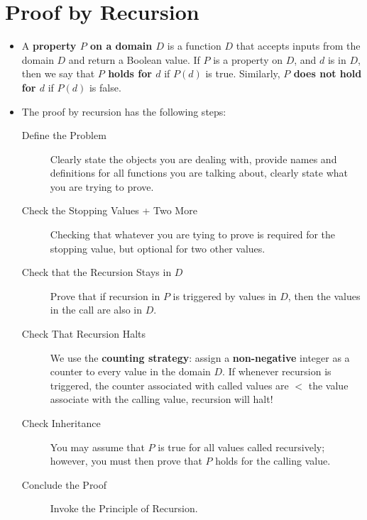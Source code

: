 \documentclass[12pt]{scrartcl}
\begin{document}
\section{Proof by Recursion}
\begin{itemize}
    \item A \textbf{property $P$ on a domain $D$} is a function $D$ that accepts inputs from the domain $D$ and return a Boolean value. If $P$ is a property on $D$, and $d$ is in $D$, then we say that \textbf{$P$ holds for $d$} if $P(d)$ is true. Similarly, \textbf{$P$ does not hold for $d$} if $P(d)$ is false.

    \item The proof by recursion has the following steps:

        \begin{description}
            \item[Define the Problem] Clearly state the objects you are dealing with, provide names and definitions for all functions you are talking about, clearly state what you are trying to prove.
            \item[Check the Stopping Values + Two More] Checking that whatever you are tying to prove is required for the stopping value, but optional for two other values.
            \item[Check that the Recursion Stays in $D$] Prove that if recursion in $P$ is triggered by values in $D$, then the values in the call are also in $D$.
            \item[Check That Recursion Halts] We use the \textbf{counting strategy}: assign a \textbf{non-negative} integer as a counter to every value in the domain $D$. If whenever recursion is triggered, the counter associated with called values are $<$ the value associate with the calling value, recursion will halt!
            \item[Check Inheritance] You may assume that $P$ is true for all values called recursively; however, you must then prove that $P$ holds for the calling value.
            \item[Conclude the Proof] Invoke the Principle of Recursion.
        \end{description}
\end{itemize}
\end{document}
